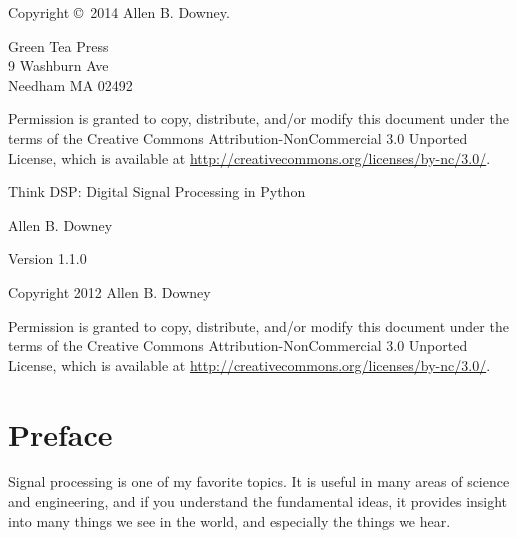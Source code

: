 \documentclass[12pt]{book}
\newcommand{\thetitle}{Think DSP: Digital Signal Processing in Python}
\newcommand{\theversion}{1.1.0}
\begin{document}
\begin{latexonly}
\pagebreak
\thispagestyle{empty}

Copyright \copyright ~2014 Allen B. Downey.


\vspace{0.2in}

\begin{flushleft}
Green Tea Press       \\
9 Washburn Ave \\
Needham MA 02492
\end{flushleft}

Permission is granted to copy, distribute, and/or modify this document
under the terms of the Creative Commons Attribution-NonCommercial 3.0 Unported
License, which is available at \url{http://creativecommons.org/licenses/by-nc/3.0/}.

\vspace{0.2in}

\end{latexonly}



\begin{htmlonly}


{\Large \thetitle}

{\large Allen B. Downey}

Version \theversion

\vspace{0.25in}

Copyright 2012 Allen B. Downey

\vspace{0.25in}

Permission is granted to copy, distribute, and/or modify this document
under the terms of the Creative Commons Attribution-NonCommercial 3.0
Unported License, which is available at
\url{http://creativecommons.org/licenses/by-nc/3.0/}.

\setcounter{chapter}{-1}

\end{htmlonly}

\fi

\chapter{Preface}
\label{preface}

Signal processing is one of my favorite topics.  It is useful
in many areas of science and engineering, and if you understand
the fundamental ideas, it provides insight into many things
we see in the world, and especially the things we hear.
\end{document}
